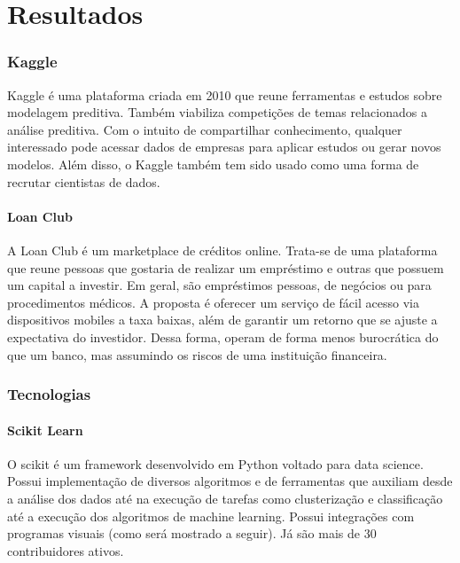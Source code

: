\part{Resultados}

\section{Kaggle}

Kaggle é uma plataforma criada em 2010 que reune ferramentas e estudos sobre modelagem preditiva. Também viabiliza competições de temas relacionados a análise preditiva. Com o intuito de compartilhar conhecimento, qualquer interessado pode acessar dados de empresas para aplicar estudos ou gerar novos modelos. Além disso, o Kaggle também tem sido usado como uma forma de recrutar cientistas de dados. 


\subsection{Loan Club}

A Loan Club é um marketplace de créditos online. Trata-se de uma plataforma que reune pessoas que gostaria de realizar um empréstimo e outras que possuem um capital a investir. Em geral, são empréstimos pessoas, de negócios ou para procedimentos médicos. A proposta é oferecer um serviço de fácil acesso via dispositivos mobiles a taxa baixas, além de garantir um retorno que se ajuste a expectativa do investidor. Dessa forma, operam de forma menos burocrática do que um banco, mas assumindo os riscos de uma instituição financeira.


\section{Tecnologias}

\subsection{Scikit Learn}

O scikit é um framework desenvolvido em Python voltado para data science. Possui implementação de diversos algoritmos e de ferramentas que auxiliam desde a análise dos dados até na execução de tarefas como clusterização e classificação até a execução dos algoritmos de machine learning. Possui integrações com programas visuais (como será mostrado a seguir). Já são mais de 30 contribuidores ativos.


